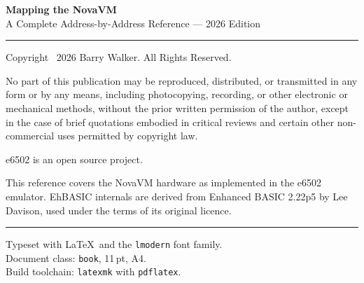 \thispagestyle{empty}
\vspace*{\fill}
\begin{flushleft}

{\large\bfseries Mapping the NovaVM}\\[0.4em]
{\normalsize A Complete Address-by-Address Reference --- 2026 Edition}

\bigskip
\noindent\rule{\textwidth}{0.4pt}
\bigskip

{\small
Copyright \textcopyright\ 2026 Barry Walker. All Rights Reserved.

\medskip
No part of this publication may be reproduced, distributed, or transmitted
in any form or by any means, including photocopying, recording, or other
electronic or mechanical methods, without the prior written permission of
the author, except in the case of brief quotations embodied in critical
reviews and certain other non-commercial uses permitted by copyright law.

\medskip
e6502 is an open source project.

\medskip
This reference covers the NovaVM hardware as implemented in the e6502
emulator. EhBASIC internals are derived from Enhanced BASIC 2.22p5 by
Lee Davison, used under the terms of its original licence.
}

\bigskip
\noindent\rule{\textwidth}{0.4pt}

\vspace{2em}
{\footnotesize\color{retrogray}
Typeset with \LaTeX\ and the \texttt{lmodern} font family.\\
Document class: \texttt{book}, 11\,pt, A4.\\
Build toolchain: \texttt{latexmk} with \texttt{pdflatex}.
}

\end{flushleft}
\vspace*{\fill}
